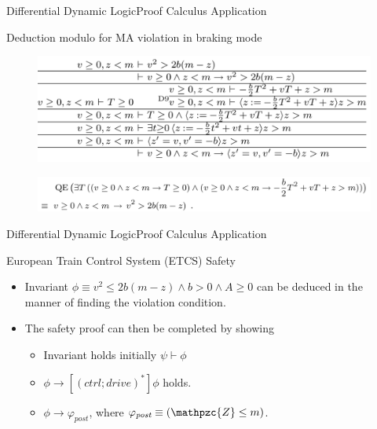 \documentclass{beamer}
\newcommand{\z}{\mathpzc{Z}}
\begin{document}
\begin{frame}{Differential Dynamic Logic}{Proof Calculus Application}
  \begin{block}{Deduction modulo for MA violation in braking mode}
    \begin{figure}
      \includegraphics[scale=0.35]{ects-precondition-violation}
    \end{figure}
    \begin{figure}
      \includegraphics[scale=0.35]{ects-quantifier-elimination}
    \end{figure}
  \end{block}
\end{frame}

\begin{frame}{Differential Dynamic Logic}{Proof Calculus Application}
  \begin{block}{European Train Control System (ETCS) Safety}
    \begin{itemize}
      \item Invariant $\phi \equiv v^2 \leq 2b(m-z) \wedge b > 0 \wedge A \geq
        0$ can be deduced in the manner of finding the violation condition.
      \item The safety proof can then be completed by showing
        \begin{itemize}
          \item Invariant holds initially $\psi \vdash \phi$
          \item $ \phi \to [(ctrl;drive)^*] \phi$ holds.
          \item $\phi \to \varphi_{\textit{post}}$, where
          $\varphi_{\textit{post}} \equiv (\z \leq m)$.
        \end{itemize}
    \end{itemize}
  \end{block}
\end{frame}
\end{document}
